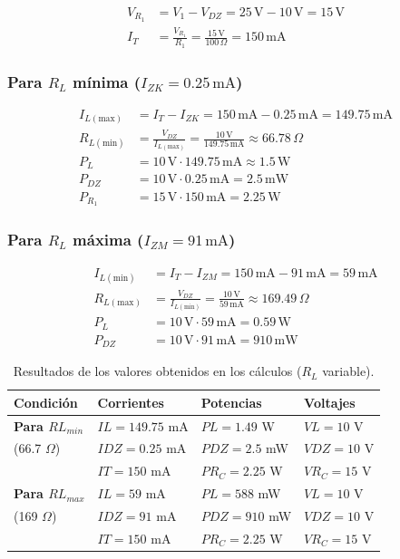 \documentclass[journal]{IEEEtran}
\begin{document}
\begin{align*}
V_{R_1} &= V_1 - V_{DZ} = 25\,\text{V} - 10\,\text{V} = 15\,\text{V} \\
I_T &= \frac{V_{R_1}}{R_1} = \frac{15\,\text{V}}{100\,\Omega} = 150\,\text{mA}
\end{align*}

\subsubsection{Para $R_L$ mínima ($I_{ZK} = 0.25\,\text{mA}$)}

\begin{align*}
I_{L(\text{max})} &= I_T - I_{ZK} = 150\,\text{mA} - 0.25\,\text{mA} = 149.75\,\text{mA} \\
R_{L(\text{min})} &= \frac{V_{DZ}}{I_{L(\text{max})}} 
= \frac{10\,\text{V}}{149.75\,\text{mA}} 
\approx 66.78\,\Omega \\
P_L &= 10\,\text{V} \cdot 149.75\,\text{mA} \approx 1.5\,\text{W} \\
P_{DZ} &= 10\,\text{V} \cdot 0.25\,\text{mA} = 2.5\,\text{mW} \\
P_{R_1} &= 15\,\text{V} \cdot 150\,\text{mA} = 2.25\,\text{W}
\end{align*}

\subsubsection{Para $R_L$ máxima ($I_{ZM} = 91\,\text{mA}$)}

\begin{align*}
I_{L(\text{min})} &= I_T - I_{ZM} = 150\,\text{mA} - 91\,\text{mA} = 59\,\text{mA} \\
R_{L(\text{max})} &= \frac{V_{DZ}}{I_{L(\text{min})}} 
= \frac{10\,\text{V}}{59\,\text{mA}} 
\approx 169.49\,\Omega \\
P_L &= 10\,\text{V} \cdot 59\,\text{mA} = 0.59\,\text{W} \\
P_{DZ} &= 10\,\text{V} \cdot 91\,\text{mA} = 910\,\text{mW}
\end{align*}

\begin{table}[H]
\centering
\begin{tabularx}{\columnwidth}{|X|X|X|X|}
\hline
\textbf{Condición} & \textbf{Corrientes} & \textbf{Potencias} & \textbf{Voltajes}\\ \hline
\textbf{Para $RL_{min}$} & $IL=149.75$ mA & $PL=1.49$ W & $VL=10$ V \\ 
(66.7 $\Omega$) & $IDZ=0.25$ mA & $PDZ=2.5$ mW & $VDZ=10$ V \\ 
& $IT=150$ mA & $PR_{C}=2.25$ W & $VR_{C}=15$ V \\ \hline
\textbf{Para $RL_{max}$} & $IL=59$ mA & $PL=588$ mW & $VL=10$ V \\ 
(169 $\Omega$) & $IDZ=91$ mA & $PDZ=910$ mW & $VDZ=10$ V \\ 
& $IT=150$ mA & $PR_{C}=2.25$ W & $VR_{C}=15$ V \\ \hline
\end{tabularx}
\caption{Resultados de los valores obtenidos en los cálculos ($R_L$ variable).}
\label{tablaCalculosRL}
\end{table}
\end{document}
